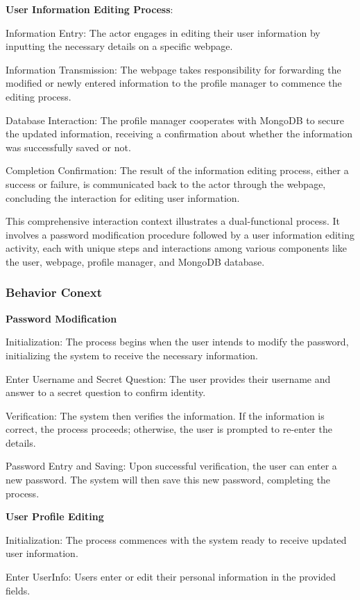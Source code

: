 \documentclass[conference]{IEEEtran}
\begin{document}
\textbf{ User Information Editing Process}:

Information Entry: The actor engages in editing their user information by inputting the necessary details on a specific webpage.

Information Transmission: The webpage takes responsibility for forwarding the modified or newly entered information to the profile manager to commence the editing process.

Database Interaction: The profile manager cooperates with MongoDB to secure the updated information, receiving a confirmation about whether the information was successfully saved or not.

Completion Confirmation: The result of the information editing process, either a success or failure, is communicated back to the actor through the webpage, concluding the interaction for editing user information.

This comprehensive interaction context illustrates a dual-functional process. It involves a password modification procedure followed by a user information editing activity, each with unique steps and interactions among various components like the user, webpage, profile manager, and MongoDB database.

\subsubsection{\textbf{Behavior Conext }}
\textbf{ }

\textbf{ Password Modification}

Initialization: The process begins when the user intends to modify the password, initializing the system to receive the necessary information.

Enter Username and Secret Question: The user provides their username and answer to a secret question to confirm identity.

Verification: The system then verifies the information. If the information is correct, the process proceeds; otherwise, the user is prompted to re-enter the details.

Password Entry and Saving: Upon successful verification, the user can enter a new password. The system will then save this new password, completing the process.

\textbf{ User Profile Editing}

Initialization: The process commences with the system ready to receive updated user information.

Enter UserInfo: Users enter or edit their personal information in the provided fields.
\end{document}

